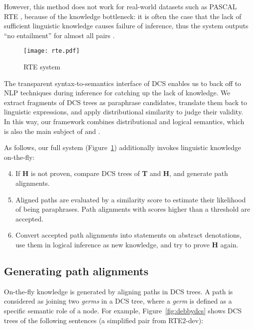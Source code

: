 \documentclass[11pt]{article}
\begin{document}
However, this method does not work for real-world datasets 
such as PASCAL RTE \cite{pascalrte}, because of the knowledge bottleneck: it is often
the case that the lack of sufficient linguistic knowledge causes
failure of inference, thus the system outputs ``no entailment''
for almost all pairs \cite{bos05}.

\begin{figure}[t]
\centering
\texttt{[image: rte.pdf]}
\caption{RTE system}
\label{fig:rte_system}
\end{figure}

The transparent syntax-to-semantics interface of DCS enables us to
back off to NLP techniques during inference for catching
up the lack of knowledge.  We extract fragments of DCS
trees as paraphrase candidates, translate them back
to linguistic expressions, and apply distributional similarity to judge their 
validity.  In this way, our
framework combines distributional and logical semantics, which is 
also the main subject of  and . 

As follows, our full system (Figure~\ref{fig:rte_system}) additionally invokes 
linguistic knowledge on-the-fly:
\begin{enumerate}
\setcounter{enumi}{3}
\item If {\bf H} is not proven, compare DCS trees of {\bf T} and
  {\bf H}, and generate path alignments.
\item Aligned paths are evaluated by a similarity score to estimate
  their likelihood of being paraphrases. Path alignments with scores 
  higher than a threshold are accepted.
\item Convert accepted path alignments into statements on
  abstract denotations, use them in logical inference as new
  knowledge, and try to prove {\bf H} again.
\end{enumerate}

\subsection{Generating path alignments}
\label{sec:ontheflygen}

On-the-fly knowledge is generated by aligning paths in DCS trees. 
A path is considered as joining two \emph{germs} in a DCS tree, where a \emph{germ} is defined 
as a specific semantic role of a node. For example, Figure~\ref{fig:debbydcs} shows DCS 
trees of the following sentences (a simplified pair from RTE2-dev):
\end{document}
